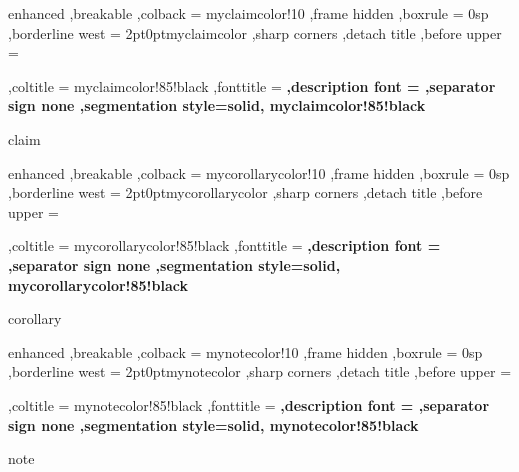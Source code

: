 \newenvironment{problem}[2][]{%
    \begin{Problem}{#2}{#1}%
    }{%
    \end{Problem}%
}
{%
    enhanced
    ,breakable
    ,colback = myclaimcolor!10
    ,frame hidden
    ,boxrule = 0sp
    ,borderline west = {2pt}{0pt}{myclaimcolor}
    ,sharp corners
    ,detach title
    ,before upper = \tcbtitle\par\smallskip
    ,coltitle = myclaimcolor!85!black
    ,fonttitle = \bfseries\sffamily
    ,description font = \mdseries
    ,separator sign none
    ,segmentation style={solid, myclaimcolor!85!black}
}
{claim}

\newenvironment{claim}[2][]{%
    \begin{Claim}{#2}{#1}%
    }{%
    \end{Claim}%
}

{%
    enhanced
    ,breakable
    ,colback = mycorollarycolor!10
    ,frame hidden
    ,boxrule = 0sp
    ,borderline west = {2pt}{0pt}{mycorollarycolor}
    ,sharp corners
    ,detach title
    ,before upper = \tcbtitle\par\smallskip
    ,coltitle = mycorollarycolor!85!black
    ,fonttitle = \bfseries\sffamily
    ,description font = \mdseries
    ,separator sign none
    ,segmentation style={solid, mycorollarycolor!85!black}
}
{corollary}

\newenvironment{corollary}[2][]{%
    \begin{Corollary}{#2}{#1}%
    }{%
    \end{Corollary}%
}


{%
    enhanced
    ,breakable
    ,colback = mynotecolor!10
    ,frame hidden
    ,boxrule = 0sp
    ,borderline west = {2pt}{0pt}{mynotecolor}
    ,sharp corners
    ,detach title
    ,before upper = \tcbtitle\par\smallskip
    ,coltitle = mynotecolor!85!black
    ,fonttitle = \bfseries\sffamily
    ,description font = \mdseries
    ,separator sign none
    ,segmentation style={solid, mynotecolor!85!black}
}
{note}

\newenvironment{note}[2][]{%
    \begin{Note}{#2}{#1}%
    }{%
    \end{Note}%
}

